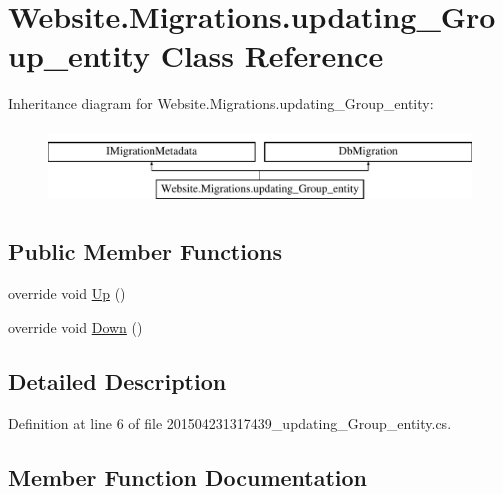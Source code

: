 \hypertarget{class_website_1_1_migrations_1_1updating___group__entity}{}\section{Website.\+Migrations.\+updating\+\_\+\+Group\+\_\+entity Class Reference}
\label{class_website_1_1_migrations_1_1updating___group__entity}
Inheritance diagram for Website.\+Migrations.\+updating\+\_\+\+Group\+\_\+entity\+:\begin{figure}[H]
\begin{center}
\leavevmode
\includegraphics[height=2.000000cm]{class_website_1_1_migrations_1_1updating___group__entity}
\end{center}
\end{figure}
\subsection*{Public Member Functions}
\begin{DoxyCompactItemize}
\item 
override void \hyperlink{class_website_1_1_migrations_1_1updating___group__entity_aff935481b6c78c5394df386c435d03d4}{Up} ()
\item 
override void \hyperlink{class_website_1_1_migrations_1_1updating___group__entity_a6bd6f8ebb2c3931c8559324cfa0b8b4e}{Down} ()
\end{DoxyCompactItemize}


\subsection{Detailed Description}


Definition at line 6 of file 201504231317439\+\_\+updating\+\_\+\+Group\+\_\+entity.\+cs.



\subsection{Member Function Documentation}
\hypertarget{class_website_1_1_migrations_1_1updating___group__entity_a6bd6f8ebb2c3931c8559324cfa0b8b4e}{}
